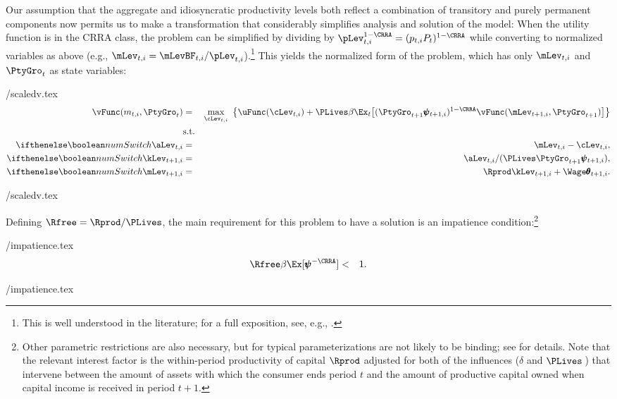 \documentclass[titlepage]{\econtex}\newcommand{\texname}{cAndCwithStickyE}
\begin{document}
Our assumption that the aggregate and idiosyncratic productivity levels both reflect a combination of transitory and purely permanent components now permits us to make a transformation that considerably simplifies analysis and solution of the model: When the utility function is in the CRRA class, the problem can be simplified by dividing by $\pLev_{t,i}^{1-\CRRA} = (p_{t,i}P_t)^{1-\CRRA}$ while converting to normalized variables as above (e.g., $\mLev_{t,i}=\mLevBF_{t,i}/\pLev_{t,i}$).\footnote{This is well understood in the literature; for a full exposition, see, e.g., \cite{BufferStockTheory}.}  This yields the normalized form of the problem, which has only $\mLev_{t,i}$ and $\PtyGro_t$ as state variables:
\begin{verbatimwrite}{\eq/scaledv.tex}
\begin{eqnarray}
    \vFunc({m}_{t,i},\PtyGro_t) & = & \max_{\cLev_{t,i}} ~ \big\{ \uFunc(\cLev_{t,i}) + \PLives \beta
    \Ex_{t}\big[ (\PtyGro_{t+1} \pmb{\psi}_{t+1,i})^{1-\CRRA}\vFunc(\mLev_{t+1,i},\PtyGro_{t+1})\big] \big\}
    \label{eq:scaledv}
\\  & \mbox{s.t.} & \nonumber
\\ \ifnumSw  \aLev_{t,i}   & = & \mLev_{t,i} - \cLev_{t,i}, \nonumber
\\ \ifnumSw  \kLev_{t+1,i} & = & \aLev_{t,i} /( \PLives \PtyGro_{t+1} \pmb{\psi}_{t+1,i} ),  \nonumber
\\ \ifnumSw  \mLev_{t+1,i} & = & \Rprod \kLev_{t+1,i} + \Wage \pmb{\theta}_{t+1,i}.  \nonumber
\end{eqnarray}
\end{verbatimwrite}
 \eq/scaledv.tex

Defining $\Rfree = \Rprod/\PLives$, the main requirement for this problem to have a solution is an impatience condition:\footnote{Other parametric restrictions are also necessary, but for typical parameterizations are not likely to be binding; see \cite{BufferStockTheory} for details.  Note that the relevant interest factor is the within-period productivity of capital $\Rprod$ adjusted for both of the influences ($\delta$ and $\PLives\,$) that intervene between the amount of assets with which the consumer ends period $t$ and the amount of productive capital owned when capital income is received in period $t+1$.}
\begin{verbatimwrite}{\eq/impatience.tex}
\begin{eqnarray*}
  \label{eq:impatience}
  \Rfree \beta  \Ex[ \pmb{\psi}^{-\CRRA}]  & < & 1.
\end{eqnarray*}
\end{verbatimwrite}
 \eq/impatience.tex
\end{document}
